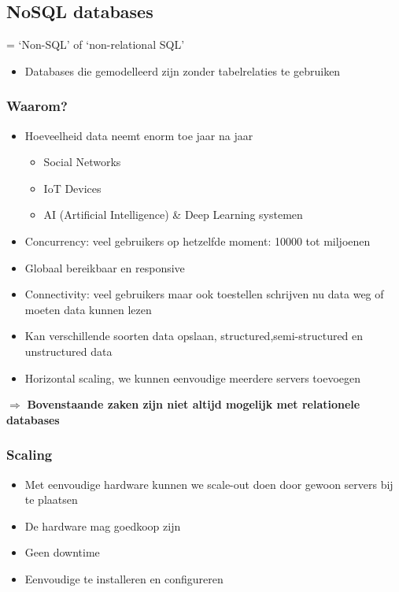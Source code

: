 \documentclass{article}
\newcommand{\bold}[1]{\textbf{#1}}
\begin{document}
\subsection{NoSQL databases}

= `Non-SQL' of `non-relational SQL'

\begin{itemize}
    \item Databases die gemodelleerd zijn zonder tabelrelaties te gebruiken
\end{itemize}

\subsubsection{Waarom?}

\begin{itemize}
    \item Hoeveelheid data neemt enorm toe jaar na jaar
    \begin{itemize}
        \item Social Networks
        \item IoT Devices
        \item AI (Artificial Intelligence) \& Deep Learning systemen
    \end{itemize}
    \item Concurrency: veel gebruikers op hetzelfde moment: 10000 tot miljoenen
    \item Globaal bereikbaar en responsive
    \item Connectivity: veel gebruikers maar ook toestellen schrijven nu data weg of moeten data kunnen lezen
    \item Kan verschillende soorten data opslaan, structured,semi-structured en unstructured data
    \item Horizontal scaling, we kunnen eenvoudige meerdere servers toevoegen
\end{itemize}

$\Rightarrow$ \bold{Bovenstaande zaken zijn niet altijd mogelijk met relationele databases}

\subsubsection{Scaling}

\begin{itemize}
    \item Met eenvoudige hardware kunnen we scale-out doen door gewoon servers bij te plaatsen
    \item De hardware mag goedkoop zijn
    \item Geen downtime
    \item Eenvoudige te installeren en configureren
\end{itemize}
\end{document}

